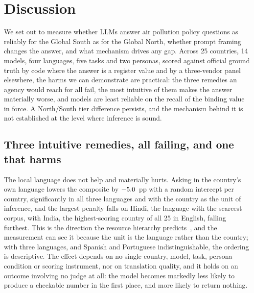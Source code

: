 \section{Discussion}
\label{sec:discussion}

We set out to measure whether LLMs answer air pollution policy questions as
reliably for the Global South as for the Global North, whether prompt framing
changes the answer, and what mechanism drives any gap. Across 25 countries, 14
models, four languages, five tasks and two personas, scored against official
ground truth by code where the answer is a register value and by a three-vendor
panel elsewhere, the harms we can demonstrate are practical: the three remedies
an agency would reach for all fail, the most intuitive of them makes the answer
materially worse, and models are least reliable on the recall of the binding
value in force. A North/South tier difference persists, and the mechanism
behind it is not established at the level where inference is sound.

\subsection{Three intuitive remedies, all failing, and one that harms}

The local language does not help and materially hurts. Asking in the country's
own language lowers the composite by $-5.0$~pp with a random
intercept per country, significantly in all three languages and with the country
as the unit of inference, and the largest
penalty falls on Hindi, the language with the scarcest corpus, with India, the
highest-scoring country of all 25 in English, falling furthest. This is the
direction the resource hierarchy predicts~\citep{joshi2020state,xue2021mt5},
and the measurement can see it because the unit is the language rather than
the country; with three languages, and Spanish and Portuguese indistinguishable,
the ordering is descriptive. The effect depends on no single country, model,
task, persona condition or scoring instrument, nor on translation quality, and
it holds on an outcome involving no judge at all: the model becomes markedly
less likely to produce a checkable number in the first place, and more likely
to return nothing.

